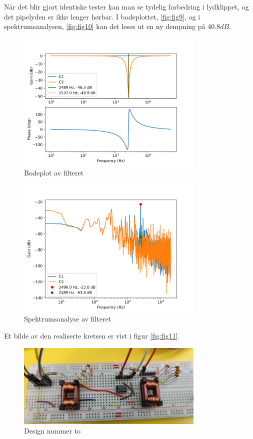 Når det blir gjort identiske tester kan man se tydelig forbedring i lydklippet, og det pipelyden er ikke lenger hørbar. I bodeplottet, \autoref{fig:fig9}, og i spektrumsanalysen, \autoref{fig:fig10} kan det leses ut en ny dempning på $40.8dB$.

\begin{figure}[!h]
	\centering
	\includegraphics[width=0.8\textwidth]{Bilder/bode2x1K.png}
	\caption{Bodeplot av filteret}
	\label{fig:fig9}
\end{figure}

\begin{figure}[H]
	\centering
	\includegraphics[width=0.8\textwidth]{Bilder/spectrum2x1K.png}
	\caption{Spektrumsanalyse av filteret}
	\label{fig:fig10}
\end{figure}

Et bilde av den realiserte kretsen er vist i figur \autoref{fig:fig11}.

\begin{figure}[H]
	\centering
	\includegraphics[width=0.8\textwidth]{Bilder/Realiser_V2.jpg}
	\caption{Design nummer to}
	\label{fig:fig11}
\end{figure}